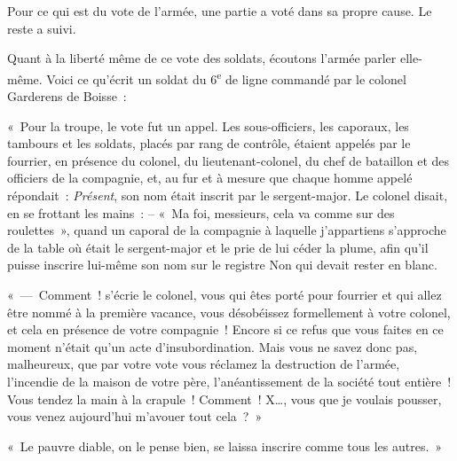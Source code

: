 \documentclass[french,twoside]{book} %
\newenvironment{quoteblock}%
  {\begin{quoting}}
  {\end{quoting}}
\newenvironment{quotebar}{%
    \def\FrameCommand{{\color{rubric!10!}\vrule width 0.5em} \hspace{0.9em}}%
    \def\OuterFrameSep{0pt} %
    \MakeFramed {\advance\hsize-\width \FrameRestore}
  }%
  {%
    \endMakeFramed
  }
\renewenvironment{quoteblock}%
  {%
    \savenotes
    \setstretch{0.9}
    \begin{quotebar}
    \smallskip
  }
  {%
    \smallskip
    \end{quotebar}
    \spewnotes
  }
\begin{document}
Pour ce qui est du vote de l’armée, une partie a voté dans sa propre cause. Le reste a suivi.\par
Quant à la liberté même de ce vote des soldats, écoutons l’armée parler elle-même. Voici ce qu’écrit un soldat du 6\textsuperscript{e} de ligne commandé par le colonel Garderens de Boisse :\par
« Pour la troupe, le vote fut un appel. Les sous-officiers, les caporaux, les tambours et les soldats, placés par rang de contrôle, étaient appelés par le fourrier, en présence du colonel, du lieutenant-colonel, du chef de bataillon et des officiers de la compagnie, et, au fur et à mesure que chaque homme appelé répondait : \emph{Présent}, son nom était inscrit par le sergent-major. Le colonel disait, en se frottant les mains : – « Ma foi, messieurs, cela va comme sur des roulettes », quand un caporal de la compagnie à laquelle j’appartiens s’approche de la table où était le sergent-major et le prie de lui céder la plume, afin qu’il puisse inscrire lui-même son nom sur le registre Non qui devait rester en blanc.\par

\begin{quoteblock}
 \noindent « — Comment ! s’écrie le colonel, vous qui êtes porté pour fourrier et qui allez être nommé à la première vacance, vous désobéissez formellement à votre colonel, et cela en présence de votre compagnie ! Encore si ce refus que vous faites en ce moment n’était qu’un acte d’insubordination. Mais vous ne savez donc pas, malheureux, que par votre vote vous réclamez la destruction de l’armée, l’incendie de la maison de votre père, l’anéantissement de la société tout entière ! Vous tendez la main à la crapule ! Comment ! X…, vous que je voulais pousser, vous venez aujourd’hui m’avouer tout cela ? »\par
 « Le pauvre diable, on le pense bien, se laissa inscrire comme tous les autres. »
 \end{quoteblock}
\end{document}
